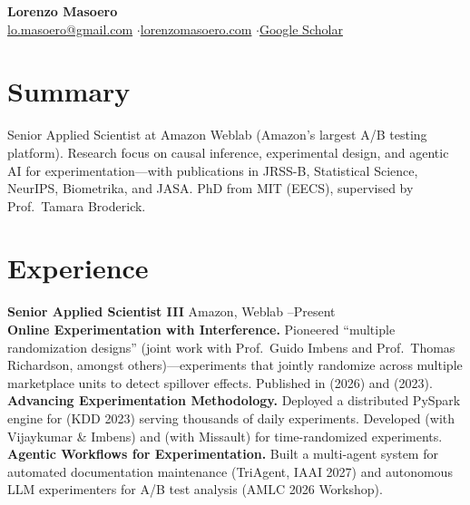 \documentclass[10pt, a4paper]{article}
\begin{document}
\newcommand{\mm}{\textbf{M}.}

\begin{center}
{\LARGE\bfseries Lorenzo Masoero}\\[2pt]
\href{mailto:lo.masoero@gmail.com}{lo.masoero@gmail.com} \quad$\cdot$\quad \href{http://lorenzomasoero.com}{lorenzomasoero.com} \quad$\cdot$\quad \href{https://scholar.google.com/citations?user=qFFGfdYAAAAJ}{Google Scholar}
\end{center}

\section{Summary}

Senior Applied Scientist at Amazon Weblab (Amazon's largest A/B testing platform). Research focus on causal inference, experimental design, and agentic AI for experimentation---with publications in JRSS-B, Statistical Science, NeurIPS, Biometrika, and JASA. PhD from MIT (EECS), supervised by Prof.\ Tamara Broderick.

\section{Experience}

\textbf{Senior Applied Scientist III} \hfill Amazon, Weblab --Present\\[2pt]
\textbf{Online Experimentation with Interference.} Pioneered ``multiple randomization designs'' (joint work with Prof.\ Guido Imbens and Prof.\ Thomas Richardson, amongst others)---experiments that jointly randomize across multiple marketplace units to detect spillover effects. Published in \href{https://doi.org/10.1093/jrsssb/qkaf073}{\color{blue}{JRSS-B}} (2026) and \href{https://projecteuclid.org/journals/statistical-science/advance-publication/Experimental-Design-in-Marketplaces/10.1214/23-STS883.short}{\color{blue}{Statistical Science}} (2023).\\[3pt]
\textbf{Advancing Experimentation Methodology.} Deployed a distributed PySpark engine for \href{https://proceedings.mlr.press/v218/masoero23a.html}{\color{blue}{covariate-adjusted causal estimation}} (KDD 2023) serving thousands of daily experiments. Developed \href{https://arxiv.org/abs/2603.06941}{\color{blue}{Demonstration Experiments}} (with Vijaykumar \& Imbens) and \href{https://arxiv.org/abs/2506.12654}{\color{blue}{robust switchback designs}} (with Missault) for time-randomized experiments.\\[3pt]
\textbf{Agentic Workflows for Experimentation.} Built a multi-agent system for automated documentation maintenance (TriAgent, IAAI 2027) and autonomous LLM experimenters for A/B test analysis (AMLC 2026 Workshop).
\end{document}
